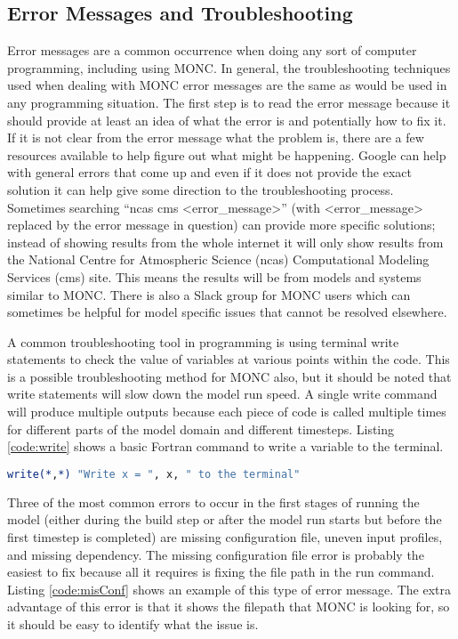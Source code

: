 \subsection{Error Messages and Troubleshooting}
Error messages are a common occurrence when doing any sort of computer programming, including using MONC. In general, the troubleshooting techniques used when dealing with MONC error messages are the same as would be used in any programming situation. The first step is to read the error message because it should provide at least an idea of what the error is and potentially how to fix it. If it is not clear from the error message what the problem is, there are a few resources available to help figure out what might be happening. Google can help with general errors that come up and even if it does not provide the exact solution it can help give some direction to the troubleshooting process. Sometimes searching ``ncas cms <error\_message>'' (with <error\_message> replaced by the error message in question) can provide more specific solutions; instead of showing results from the whole internet it will only show results from the National Centre for Atmospheric Science (ncas) Computational Modeling Services (cms) site. This means the results will be from models and systems similar to MONC. There is also a Slack group for MONC users which can sometimes be helpful for model specific issues that cannot be resolved elsewhere.

A common troubleshooting tool in programming is using terminal write statements to check the value of variables at various points within the code. This is a possible troubleshooting method for MONC also, but it should be noted that write statements will slow down the model run speed. A single write command will produce multiple outputs because each piece of code is called multiple times for different parts of the model domain and different timesteps. Listing \ref{code:write} shows a basic Fortran command to write a variable to the terminal.

\begin{lstlisting}[language=fortran,caption={Example of a Fortran write statement for writing text and variable values to the terminal. In this example, x is a variable and will be replaced in the printed string by the value stored in x.},label={code:write}]
write(*,*) "Write x = ", x, " to the terminal"
\end{lstlisting}

Three of the most common errors to occur in the first stages of running the model (either during the build step or after the model run starts but before the first timestep is completed) are missing configuration file, uneven input profiles, and missing dependency. The missing configuration file error is probably the easiest to fix because all it requires is fixing the file path in the run command. Listing \ref{code:misConf} shows an example of this type of error message. The extra advantage of this error is that it shows the filepath that MONC is looking for, so it should be easy to identify what the issue is.

